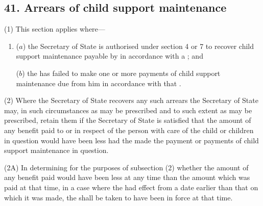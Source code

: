 \documentclass[a4paper]{article}
\begin{document}
\subsection{41. Arrears of child support maintenance}

(1) This section applies where---
\begin{enumerate}\item[]
($a$) the Secretary of State is authorised under section 4 or 7 to recover
child support maintenance payable by  in accordance with a ; and

($b$) the  has failed to make one or more
payments of child support maintenance due from him in accordance with
that .
\end{enumerate}

(2) Where the Secretary of State recovers any such arrears the Secretary of State may, in such circumstances as may be prescribed and to such extent as may be prescribed, retain them if the Secretary of State is satisfied that the amount of any benefit paid to or in respect of the person with care of the child or children in question would have been less had the  made the payment or payments of child support maintenance in question.

(2A) In determining for the purposes of subsection (2) whether the amount of any benefit paid would have been less at any time than the amount which was paid at that time, in a case where the  had effect from a date earlier than that on which it was made, the  shall be taken to have been in force at that time.
\end{document}
